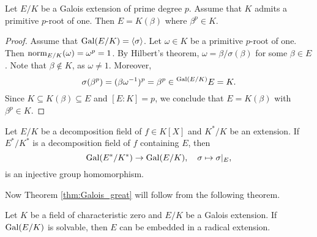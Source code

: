 \begin{lemma}
\label{lem:E=K(beta)}
    Let $E/K$ be a Galois extension of prime degree $p$. Assume that $K$ admits a primitive $p$-root of one. 
    Then $E=K(\beta)$ where $\beta^p\in K$. 
\end{lemma}

\begin{proof}
    Assume that $\operatorname{Gal}(E/K)=\langle\sigma\rangle$. 
    Let $\omega\in K$ be a primitive $p$-root of one. Then $\operatorname{norm}_{E/K}(\omega)=\omega^p=1$. By Hilbert's theorem, 
    $\omega=\beta/\sigma(\beta)$ for some $\beta\in E$. Note that $\beta\not\in K$, as $\omega\ne1$. Moreover, 
    \[
    \sigma(\beta^p)=(\beta\omega^{-1})^p=\beta^p\in\prescript{\operatorname{Gal}(E/K)}{}{E}=K.
    \]
    Since $K\subseteq K(\beta)\subseteq E$ and $[E:K]=p$, we conclude that $E=K(\beta)$ with $\beta^p\in K$. 
\end{proof}

\begin{exercise}
\label{xca:embedding}
    Let $E/K$ be a decomposition field of $f\in K[X]$ and $K^*/K$ be an extension.
    If $E^*/K^*$ is a decomposition field of $f$ containing $E$, then 
    \[
    \operatorname{Gal}(E^*/K^*)\to\operatorname{Gal}(E/K),\quad \sigma\mapsto\sigma|_{E},
    \]
    is an injective group homomorphism. 
\end{exercise}

Now Theorem \ref{thm:Galois_great} will follow from the following theorem. 

\begin{theorem}
    Let $K$ be a field of characteristic zero and $E/K$ be a Galois extension.
    If $\operatorname{Gal}(E/K)$ is solvable, then $E$ can be embedded in a radical extension. 
\end{theorem}

